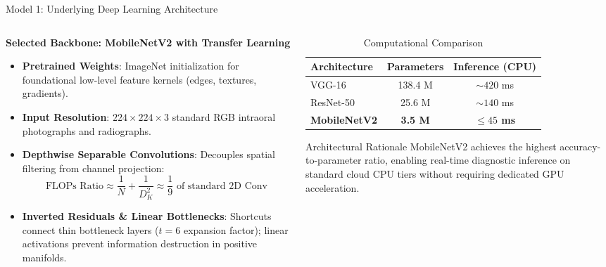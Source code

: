 \documentclass[aspectratio=169, 10pt]{beamer}
\begin{document}
\begin{frame}{Model 1: Underlying Deep Learning Architecture}
\begin{columns}[T]
    \begin{column}{0.55\textwidth}
        \textbf{Selected Backbone: MobileNetV2 with Transfer Learning}
        \begin{itemize}
            \item \textbf{Pretrained Weights}: ImageNet initialization for foundational low-level feature kernels (edges, textures, gradients).
            \item \textbf{Input Resolution}: $224 \times 224 \times 3$ standard RGB intraoral photographs and radiographs.
            \item \textbf{Depthwise Separable Convolutions}:
            Decouples spatial filtering from channel projection:
            \begin{equation*}
                \text{FLOPs Ratio} \approx \frac{1}{N} + \frac{1}{D_K^2} \approx \frac{1}{9} \text{ of standard 2D Conv}
            \end{equation*}
            \item \textbf{Inverted Residuals \& Linear Bottlenecks}:
            Shortcuts connect thin bottleneck layers ($t=6$ expansion factor); linear activations prevent information destruction in positive manifolds.
        \end{itemize}
    \end{column}
    \begin{column}{0.45\textwidth}
        \begin{table}[H]
        \centering
        \scriptsize
        \begin{tabular}{@{}lcc@{}}
        \toprule
        \textbf{Architecture} & \textbf{Parameters} & \textbf{Inference (CPU)} \\ \midrule
        VGG-16 & 138.4 M & $\sim 420$ ms \\
        ResNet-50 & 25.6 M & $\sim 140$ ms \\
        \textbf{MobileNetV2} & \textbf{3.5 M} & \textbf{$\le 45$ ms} \\ \bottomrule
        \end{tabular}
        \caption{Computational Comparison}
        \end{table}
        \begin{block}{Architectural Rationale}
            \scriptsize MobileNetV2 achieves the highest accuracy-to-parameter ratio, enabling real-time diagnostic inference on standard cloud CPU tiers without requiring dedicated GPU acceleration.
        \end{block}
    \end{column}
\end{columns}
\end{frame}
\end{document}
